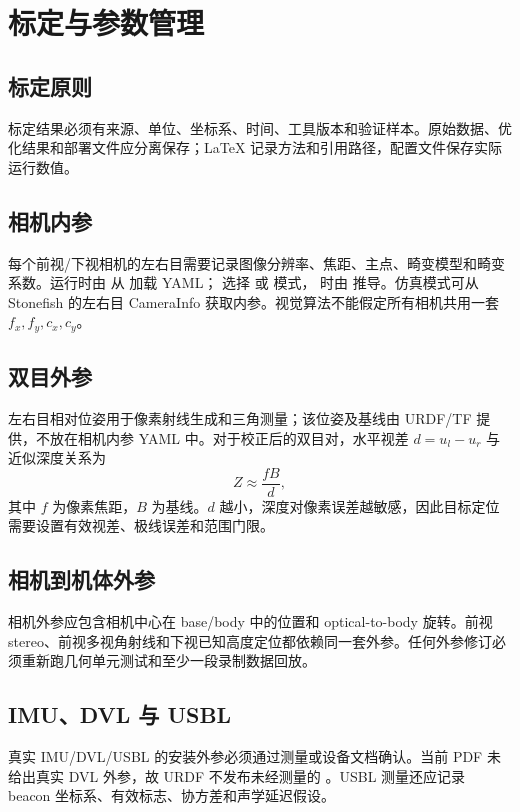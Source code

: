 \chapter{标定与参数管理}
\label{ch:calibration}

\section{标定原则}
标定结果必须有来源、单位、坐标系、时间、工具版本和验证样本。原始数据、优化结果和部署文件应分离保存；LaTeX 记录方法和引用路径，配置文件保存实际运行数值。

\section{相机内参}
每个前视/下视相机的左右目需要记录图像分辨率、焦距、主点、畸变模型和畸变系数。运行时由  从  加载 YAML； 选择  或  模式， 时由  推导。仿真模式可从 Stonefish 的左右目 CameraInfo 获取内参。视觉算法不能假定所有相机共用一套 $f_x,f_y,c_x,c_y$。

\section{双目外参}
左右目相对位姿用于像素射线生成和三角测量；该位姿及基线由 URDF/TF 提供，不放在相机内参 YAML 中。对于校正后的双目对，水平视差 $d=u_l-u_r$ 与近似深度关系为
\begin{equation}
  Z \approx \frac{fB}{d},
\end{equation}
其中 $f$ 为像素焦距，$B$ 为基线。$d$ 越小，深度对像素误差越敏感，因此目标定位需要设置有效视差、极线误差和范围门限。

\section{相机到机体外参}
相机外参应包含相机中心在 base/body 中的位置和 optical-to-body 旋转。前视 stereo、前视多视角射线和下视已知高度定位都依赖同一套外参。任何外参修订必须重新跑几何单元测试和至少一段录制数据回放。

\section{IMU、DVL 与 USBL}
真实 IMU/DVL/USBL 的安装外参必须通过测量或设备文档确认。当前 PDF 未给出真实 DVL 外参，故 URDF 不发布未经测量的 。USBL 测量还应记录 beacon 坐标系、有效标志、协方差和声学延迟假设。

